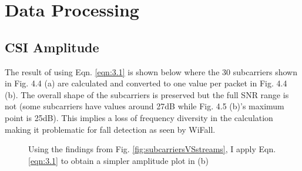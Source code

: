 \section{Data Processing}
\subsection{CSI Amplitude}
The result of using Eqn. \ref{eqn:3.1} is shown below where the 30 subcarriers shown in Fig. 4.4 (a) are calculated and converted to one value per packet in Fig. 4.4 (b). The overall shape of the subcarriers is preserved but the full SNR range is not (some subcarriers have values around 27dB while Fig. 4.5 (b)'s maximum point is 25dB). This implies a loss of frequency diversity in the calculation making it problematic for fall detection as seen by WiFall.
\begin{figure}[H]%
    \centering
    \qquad
    \caption{Using the findings from Fig. \ref{fig:subcarriersVSstreams}, I apply Eqn. \ref{eqn:3.1} to obtain a simpler amplitude plot in (b)}%
    \label{fig:applyingAmplitudeEquation}%
\end{figure}
